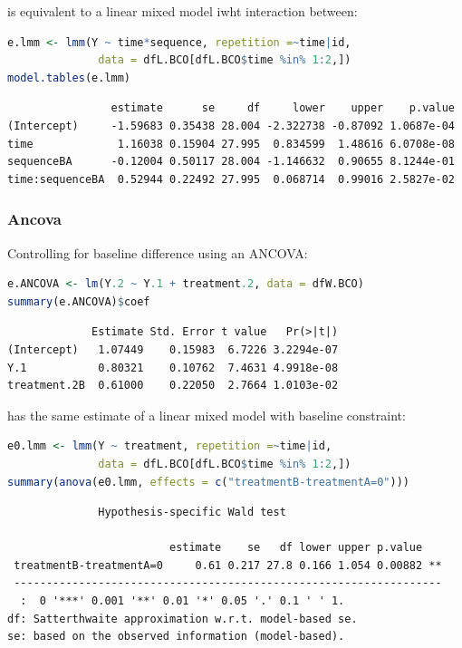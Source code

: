 \documentclass[12pt]{article}
\begin{document}
is equivalent to a linear mixed model iwht interaction between:
\begin{lstlisting}[language=r,numbers=none]
e.lmm <- lmm(Y ~ time*sequence, repetition =~time|id,
              data = dfL.BCO[dfL.BCO$time %in% 1:2,])
model.tables(e.lmm)
\end{lstlisting}

\label{}
\begin{verbatim}
                estimate      se     df     lower    upper    p.value
(Intercept)     -1.59683 0.35438 28.004 -2.322738 -0.87092 1.0687e-04
time             1.16038 0.15904 27.995  0.834599  1.48616 6.0708e-08
sequenceBA      -0.12004 0.50117 28.004 -1.146632  0.90655 8.1244e-01
time:sequenceBA  0.52944 0.22492 27.995  0.068714  0.99016 2.5827e-02
\end{verbatim}
\subsubsection{Ancova}
\label{sec:orgdd521d5}

Controlling for baseline difference using an ANCOVA:
\begin{lstlisting}[language=r,numbers=none]
e.ANCOVA <- lm(Y.2 ~ Y.1 + treatment.2, data = dfW.BCO)
summary(e.ANCOVA)$coef
\end{lstlisting}

\label{}
\begin{verbatim}
             Estimate Std. Error t value   Pr(>|t|)
(Intercept)   1.07449    0.15983  6.7226 3.2294e-07
Y.1           0.80321    0.10762  7.4631 4.9918e-08
treatment.2B  0.61000    0.22050  2.7664 1.0103e-02
\end{verbatim}


has the same estimate of a linear mixed model with baseline
constraint:
\begin{lstlisting}[language=r,numbers=none]
e0.lmm <- lmm(Y ~ treatment, repetition =~time|id,
              data = dfL.BCO[dfL.BCO$time %in% 1:2,])
summary(anova(e0.lmm, effects = c("treatmentB-treatmentA=0")))
\end{lstlisting}

\label{}
\begin{verbatim}
              Hypothesis-specific Wald test 

                         estimate    se   df lower upper p.value   
 treatmentB-treatmentA=0     0.61 0.217 27.8 0.166 1.054 0.00882 **
 ------------------------------------------------------------------ 
  :  0 '***' 0.001 '**' 0.01 '*' 0.05 '.' 0.1 ' ' 1.
df: Satterthwaite approximation w.r.t. model-based se. 
se: based on the observed information (model-based).
\end{verbatim}
\end{document}
